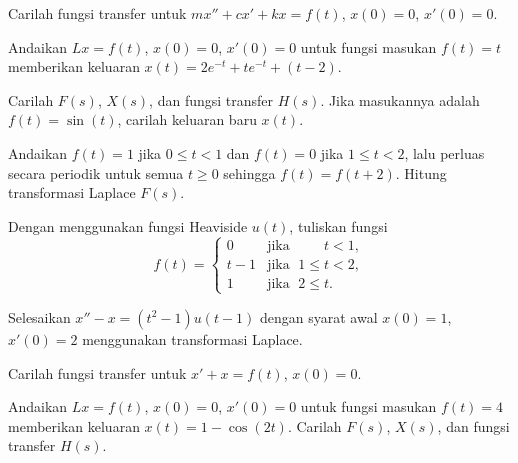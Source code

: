 \begin{exercise}
Carilah fungsi transfer untuk 
$m x'' + c x' + kx = f(t)$,
$x(0)=0$, $x'(0)=0$.
\end{exercise}

\begin{exercise}
Andaikan $Lx = f(t)$, $x(0)=0$, $x'(0)=0$
untuk fungsi masukan $f(t) = t$ memberikan keluaran
$x(t) = 2e^{-t} + te^{-t} + (t-2)$.
\begin{tasks}
\task Carilah $F(s)$, $X(s)$, dan fungsi transfer $H(s)$.
\task Jika masukannya adalah $f(t) = \sin(t)$, carilah keluaran baru $x(t)$.
\end{tasks}
\end{exercise}

\begin{exercise}
Andaikan $f(t) = 1$ jika $0 \leq t < 1$ dan $f(t)=0$ jika $1 \leq t < 2$, lalu
perluas secara periodik untuk semua $t \geq 0$ sehingga $f(t)=f(t+2)$.  Hitung
transformasi Laplace $F(s)$.
\end{exercise}

\setcounter{exercise}{100}

\begin{exercise}
Dengan menggunakan fungsi Heaviside $u(t)$, tuliskan fungsi
\begin{equation*}
f(t) =
\begin{cases}
0 & \text{jika } \; \phantom{1 \leq {}} t < 1  , \\
t-1 & \text{jika } \; 1 \leq t < 2 , \\
1 & \text{jika } \; 2 \leq t .
\end{cases}
\end{equation*}
\end{exercise}

\begin{exercise}
Selesaikan $x''-x = (t^2-1) u(t-1)$ dengan syarat awal $x(0)=1$, $x'(0) = 2$
menggunakan transformasi Laplace.
\end{exercise}
 
\begin{exercise}
Carilah fungsi transfer untuk 
$x' + x = f(t)$,
$x(0)=0$.
\end{exercise}

\begin{exercise}
Andaikan $Lx = f(t)$, $x(0)=0$, $x'(0)=0$
untuk fungsi masukan $f(t) = 4$ memberikan keluaran
$x(t) = 1 - \cos(2 t)$.  Carilah $F(s)$, $X(s)$, dan fungsi transfer
$H(s)$.
\end{exercise}

